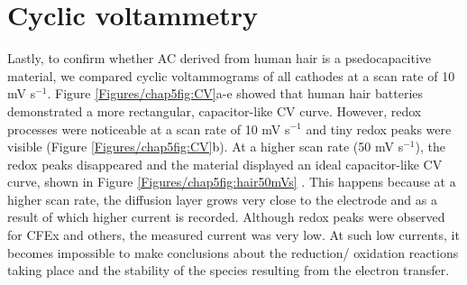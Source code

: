 \section*{Cyclic voltammetry}
Lastly, to confirm whether AC derived from human hair is a psedocapacitive material, we compared cyclic voltammograms of all cathodes at a scan rate of 10 mV s$^{-1}$. Figure \ref{Figures/chap5fig:CV}a-e showed that human hair batteries demonstrated a more rectangular, capacitor-like CV curve. However, redox processes were noticeable at a scan rate of 10 mV s$^{-1}$ and tiny redox peaks were visible (Figure \ref{Figures/chap5fig:CV}b). At a higher scan rate (50 mV s$^{-1}$), the redox peaks disappeared and the material displayed an ideal capacitor-like CV curve, shown in Figure \ref{Figures/chap5fig:hair50mVs} \cite{guan_capacitive_2016, dupont_separating_2015}. This happens because at a higher scan rate, the diffusion layer grows very close to the electrode and as a result of which higher current is recorded. Although redox peaks were observed for CFEx and others, the measured current was very low. At such low currents, it becomes impossible to make conclusions about the reduction/ oxidation reactions taking place and the stability of the species resulting from the electron transfer.


